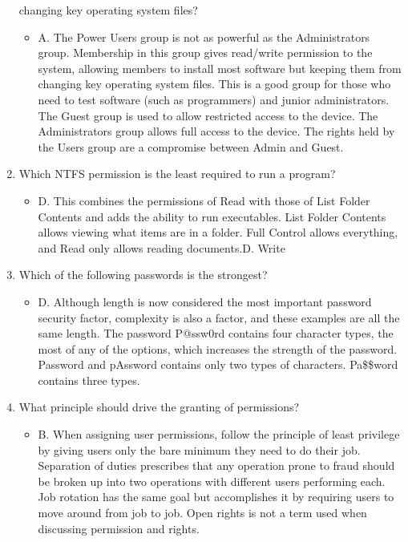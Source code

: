 \documentclass{article}
\begin{document}
\begin{enumerate}
changing key operating system files?
    \begin{itemize}
        \item A. The Power Users group is not as powerful as the Administrators group. Membership
in this group gives read/write permission to the system, allowing members to install most
software but keeping them from changing key operating system files. This is a good group
for those who need to test software (such as programmers) and junior administrators. The
Guest group is used to allow restricted access to the device. The Administrators group
allows full access to the device. The rights held by the Users group are a compromise
between Admin and Guest.
    \end{itemize}
    \item Which NTFS permission is the least required to run a program?
    \begin{itemize}
        \item D. This combines the permissions of Read with those of List Folder Contents and adds the
ability to run executables. List Folder Contents allows viewing what items are in a folder.
Full Control allows everything, and Read only allows reading documents.D. Write
    \end{itemize}
    \item Which of the following passwords is the strongest?
    \begin{itemize}
        \item D. Although length is now considered the most important password security factor,
complexity is also a factor, and these examples are all the same length. The password
P@ssw0rd contains four character types, the most of any of the options, which increases
the strength of the password. Password and pAssword contains only two types of
characters. Pa\$\$word contains three types.
    \end{itemize}
    \item What principle should drive the granting of permissions?
    \begin{itemize}
        \item B. When assigning user permissions, follow the principle of least privilege by giving users only
the bare minimum they need to do their job. Separation of duties prescribes that any operation
prone to fraud should be broken up into two operations with different users performing each.
Job rotation has the same goal but accomplishes it by requiring users to move around from job
to job. Open rights is not a term used when discussing permission and rights.

\end{itemize}
\end{enumerate}
\end{document}
